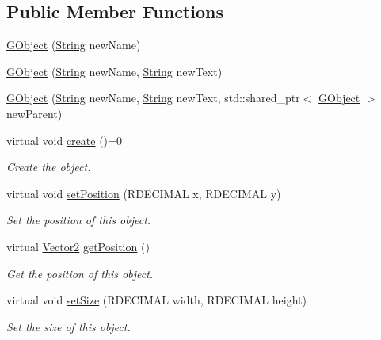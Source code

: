 \subsection*{Public Member Functions}
\begin{DoxyCompactItemize}
\item 
\hyperlink{class_rad_j_a_v_1_1_g_u_i_1_1_g_object_a55ca56da5ee42b7b8dffdbf22024323f}{G\+Object} (\hyperlink{class_rad_j_a_v_1_1_string}{String} new\+Name)
\item 
\hyperlink{class_rad_j_a_v_1_1_g_u_i_1_1_g_object_a1aacac49c284797fab74ece1298fc3a5}{G\+Object} (\hyperlink{class_rad_j_a_v_1_1_string}{String} new\+Name, \hyperlink{class_rad_j_a_v_1_1_string}{String} new\+Text)
\item 
\hyperlink{class_rad_j_a_v_1_1_g_u_i_1_1_g_object_a354230117eeeda4b2fde9c114833dba6}{G\+Object} (\hyperlink{class_rad_j_a_v_1_1_string}{String} new\+Name, \hyperlink{class_rad_j_a_v_1_1_string}{String} new\+Text, std\+::shared\+\_\+ptr$<$ \hyperlink{class_rad_j_a_v_1_1_g_u_i_1_1_g_object}{G\+Object} $>$ new\+Parent)
\item 
virtual void \hyperlink{class_rad_j_a_v_1_1_g_u_i_1_1_g_object_a0758b7d4b69fc985c20c8dc680c8464c}{create} ()=0
\begin{DoxyCompactList}\small\item\em Create the object. \end{DoxyCompactList}\item 
virtual void \hyperlink{class_rad_j_a_v_1_1_g_u_i_1_1_g_object_a4fa92764a95242183fcb3758483d5d7d}{set\+Position} (R\+D\+E\+C\+I\+M\+AL x, R\+D\+E\+C\+I\+M\+AL y)
\begin{DoxyCompactList}\small\item\em Set the position of this object. \end{DoxyCompactList}\item 
virtual \hyperlink{class_rad_j_a_v_1_1_vector2}{Vector2} \hyperlink{class_rad_j_a_v_1_1_g_u_i_1_1_g_object_adc0cac980eb118e93aa39b5cd72c9602}{get\+Position} ()
\begin{DoxyCompactList}\small\item\em Get the position of this object. \end{DoxyCompactList}\item 
virtual void \hyperlink{class_rad_j_a_v_1_1_g_u_i_1_1_g_object_a2249e2abbb4cafb519512ec9c95f9d5e}{set\+Size} (R\+D\+E\+C\+I\+M\+AL width, R\+D\+E\+C\+I\+M\+AL height)
\begin{DoxyCompactList}\small\item\em Set the size of this object. \end{DoxyCompactList}\item 

\end{DoxyCompactItemize}
